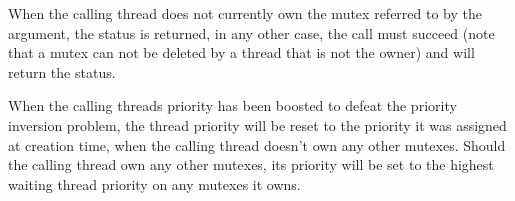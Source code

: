When the calling thread does
not currently own the mutex referred to by the  argument, the
 status is returned, in any other case, the call must
succeed (note that a mutex can not be deleted by a thread that is not the
owner) and will return the  status.

When the calling threads priority has been boosted to defeat the priority
inversion problem, the thread priority will be reset to the priority it
was assigned at creation time, when the calling thread doesn't own any other
mutexes. Should the calling thread own any other mutexes, its priority will
be set to the highest waiting thread priority on any mutexes it owns.

